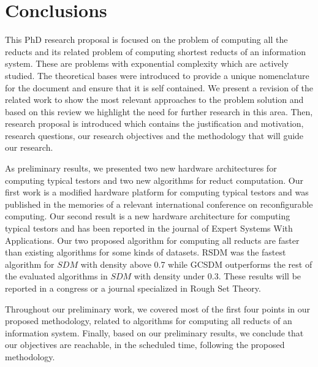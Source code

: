 \documentclass[authoryear,11pt]{elsarticle}
\begin{document}
\newpage 
\section{Conclusions}
	This PhD research proposal is focused on the problem of computing all the reducts and its related problem of
	computing shortest reducts of an information system. These are problems with exponential complexity which are
	actively studied. The theoretical bases were introduced to provide a unique nomenclature for the document and
	ensure that it is self contained. We present a revision of the related work to show the most relevant 
	approaches to the problem solution and based on this review we highlight the need for further research in this
	area. Then, research proposal is introduced which contains the justification and motivation, research 
	questions, our research objectives and the methodology that will guide our research.
	
	As preliminary results, we presented two new hardware architectures for computing typical testors and two new
	algorithms for reduct computation. Our first work is a modified hardware platform for computing typical 
	testors and was published in the memories of a relevant international conference on reconfigurable computing.
	Our second result is a new hardware architecture for computing typical testors and has been reported in the
	journal of Expert Systems With Applications. Our two proposed algorithm for computing all reducts are faster
	than existing algorithms for some kinds of datasets. RSDM was the fastest algorithm for $SDM$ with density 
	above 0.7 while GCSDM outperforms the rest of the evaluated algorithms in $SDM$ with density under 0.3. These 
	results will be reported in a congress or a journal specialized in Rough Set Theory.

	Throughout our preliminary work, we covered most of the first four points in our proposed methodology, related
	to algorithms for computing all reducts of an information system.
	Finally, based on our preliminary results, we conclude that our objectives are reachable, in the scheduled
	time, following 	the proposed methodology.
	
\newpage 
{}

\end{document}

